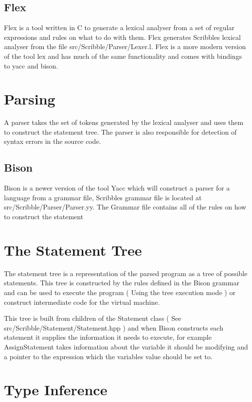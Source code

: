 \documentclass[]{final_report}
\begin{document}
\subsection{Flex}

Flex is a tool written in C to generate a lexical analyser from a set of regular expressions and rules on what to do with them. Flex generates Scribbles lexical analyser from the file src/Scribble/Parser/Lexer.l. Flex is a more modern version of the tool lex and has much of the same functionality and comes with bindings to yacc and bison.

\section{Parsing}

A parser takes the set of tokens generated by the lexical analyser and uses them to construct the statement tree. The parser is also responsible for detection of syntax errors in the source code.

\subsection{Bison}

Bison is a newer version of the tool Yacc which will construct a parser for a language from a grammar file, Scribbles grammar file is located at src/Scribble/Parser/Parser.yy. The Grammar file contains all of the rules on how to construct the statement 

\section{The Statement Tree}

The statement tree is a representation of the parsed program as a tree of possible statements. This tree is constructed by the rules defined in the Bison grammar and can be used to execute the program ( Using the tree execution mode ) or construct intermediate code for the virtual machine.

This tree is built from children of the Statement class ( See src/Scribble/Statement/Statement.hpp ) and when Bison constructs each statement it supplies the information it needs to execute, for example AssignStatement takes information about the variable it should be modifying and a pointer to the expression which the variables value should be set to.

\section{Type Inference}
\end{document}

